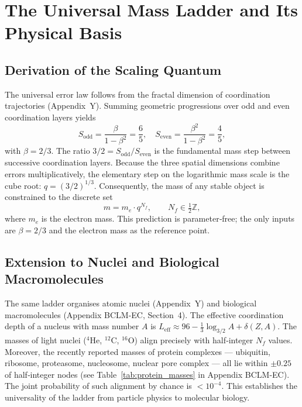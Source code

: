 \documentclass[11pt,a4paper]{article}
\begin{document}
	\section{The Universal Mass Ladder and Its Physical Basis}
	
	\subsection{Derivation of the Scaling Quantum}
	
	The universal error law follows from the fractal dimension of coordination trajectories (Appendix~Y). Summing geometric progressions over odd and even coordination layers yields
	\[
	S_{\mathrm{odd}} = \frac{\beta}{1-\beta^2} = \frac{6}{5}, \quad
	S_{\mathrm{even}} = \frac{\beta^2}{1-\beta^2} = \frac{4}{5},
	\]
	with \(\beta = 2/3\). The ratio \(3/2 = S_{\mathrm{odd}}/S_{\mathrm{even}}\) is the fundamental mass step between successive coordination layers. Because the three spatial dimensions combine errors multiplicatively, the elementary step on the logarithmic mass scale is the cube root: \(q = (3/2)^{1/3}\). Consequently, the mass of any stable object is constrained to the discrete set
	\begin{equation}
		m = m_e \cdot q^{N_f}, \qquad N_f \in \tfrac12\mathbb{Z},
		\label{eq:quantization}
	\end{equation}
	where \(m_e\) is the electron mass. This prediction is parameter‑free; the only inputs are \(\beta = 2/3\) and the electron mass as the reference point.
	
	\subsection{Extension to Nuclei and Biological Macromolecules}
	
	The same ladder organises atomic nuclei (Appendix~Y) and biological macromolecules (Appendix BCLM-EC, Section~4). The effective coordination depth of a nucleus with mass number \(A\) is \(L_{\mathrm{eff}} \approx 96 - \frac13 \log_{3/2} A + \delta(Z,A)\). The masses of light nuclei (\(^4\)He, \(^{12}\)C, \(^{16}\)O) align precisely with half‑integer \(N_f\) values. Moreover, the recently reported masses of protein complexes — ubiquitin, ribosome, proteasome, nucleosome, nuclear pore complex — all lie within \(\pm 0.25\) of half‑integer nodes (see Table~\ref{tab:protein_masses} in Appendix BCLM-EC). The joint probability of such alignment by chance is \(< 10^{-4}\). This establishes the universality of the ladder from particle physics to molecular biology.
	
\end{document}
